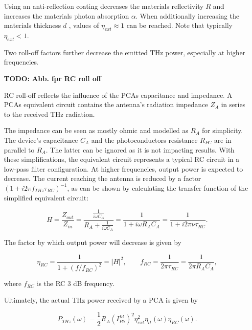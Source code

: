 Using an anti-reflection coating decreases the materials reflectivity $R$ and increases the materials photon absorption $\alpha$. When additionally increasing the materials thickness $d$ , values of $\eta_{ext} \approx 1$ can be reached. Note that typically $\eta_{ext} < 1$. 

Two roll-off factors further decrease the emitted THz power, especially at higher frequencies. 




\textbf{TODO: Abb. fpr RC roll off}

RC roll-off reflects the influence of the PCAs capacitance and impedance. A PCAs equivalent circuit %
contains the antenna's radiation impedance $Z_A$ in series to the received THz radiation.

The impedance can be seen as mostly ohmic and modelled as $R_A$ for simplicity. The device's capacitance $C_A$ and the photoconductors resistance $R_{PC}$ are in parallel to $R_A$. The latter can be ignored as it is not impacting results. With these simplifications, the equivalent circuit represents a typical RC circuit in a low-pass filter configuration. At higher frequencies, output power is expected to decrease. The current reaching the antenna is reduced by a factor $(1 + i2\pi f_{THz}\tau_{RC})^{-1}$, as can be shown by calculating the transfer function of the simplified equivalent circuit: 

\begin{equation}
    H = \frac{Z_{out}}{Z_{in}} = \frac{\frac{1}{i\omega C_A}}{R_A + \frac{1}{i\omega C_A}} = \frac{1}{1 + i\omega R_A C_A} = \frac{1}{1 + i 2\pi \nu \tau_{RC}}.    
\end{equation}

The factor by which output power will decrease is given by 

\begin{equation}
    \eta_{RC} = \frac{1}{1+ (f/f_{RC})^2} = |H|^2,  \qquad  f_{RC} = \frac{1}{2\pi\tau_{RC}} = \frac{1}{2\pi R_A C_A},
\end{equation}

where $f_{RC}$ is the RC 3 dB frequency.

Ultimately, the actual THz power received by a PCA is given by 

\begin{equation}
    P_{THz}(\omega) = \frac{1}{2}R_A(I_{Ph}^{Id})^2\eta_{ext}^2\eta_{lt}(\omega)\eta_{RC}(\omega).
    \label{eq_power}
\end{equation}

